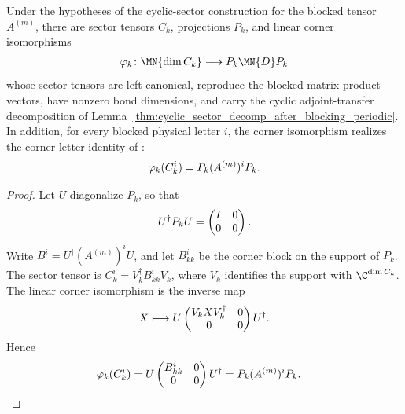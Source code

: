 \begin{lemma}
    \label{thm:cyclic_sector_compression_letter}
    \leanok
    Under the hypotheses of the cyclic-sector construction for the blocked
    tensor $A^{(m)}$, there are sector tensors $C_k$, projections $P_k$, and
    linear corner isomorphisms
    \begin{align}
        \varphi_k\colon \MN{\dim C_k}
        \longrightarrow P_k\MN{D}P_k \notag
    \end{align}
    whose sector tensors are left-canonical, reproduce the blocked
    matrix-product vectors, have nonzero bond dimensions, and carry the cyclic
    adjoint-transfer decomposition of
    Lemma~\ref{thm:cyclic_sector_decomp_after_blocking_periodic}. In addition,
    for every blocked physical letter $i$, the corner isomorphism realizes the
    corner-letter identity of
    \cite[Lemma~\emph{bdcf}, eq.~\emph{Cu}]{DeLasCuevas2017Irreducible}:
    \begin{align}
        \varphi_k(C_k^i)=P_k(A^{(m)})^iP_k. \notag
    \end{align}
\end{lemma}

\begin{proof}\leanok
    Let $U$ diagonalize $P_k$, so that
    \begin{align}
        U^\dagger P_kU
        =
        \begin{pmatrix}
            I & 0 \\
            0 & 0
        \end{pmatrix}. \notag
    \end{align}
    Write $B^i=U^\dagger(A^{(m)})^iU$, and let $B_{kk}^i$ be the corner block
    on the support of $P_k$. The sector tensor is
    $C_k^i=V_k^\dagger B_{kk}^iV_k$, where $V_k$ identifies the support with
    $\C^{\dim C_k}$. The linear corner isomorphism is the inverse map
    \begin{align}
        X\longmapsto
        U
        \begin{pmatrix}
            V_kXV_k^\dagger & 0 \\
            0               & 0
        \end{pmatrix}
        U^\dagger. \notag
    \end{align}
    Hence
    \begin{align}
        \varphi_k(C_k^i)
         & =
        U
        \begin{pmatrix}
            B_{kk}^i & 0 \\
            0        & 0
        \end{pmatrix}
        U^\dagger
        =P_k(A^{(m)})^iP_k. \notag
    \end{align}
\end{proof}

